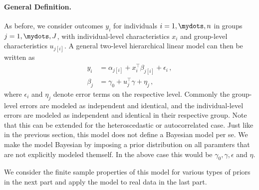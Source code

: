 \paragraph{General Definition.}
As before, we consider outcomes $y_i$ for individuals $i=1,\mydots,n$ in groups $j=1,\mydots,J$, with individual-level characteristics $x_i$ and group-level characteristics $u_{j[i]}$.
A general two-level hierarchical linear model can then be written as
\begin{align}
  y_i &= \alpha_{j[i]} + x_i^{\intercal} \beta_{j[i]} + \epsilon_i \,, \tag{Individual Level}\\
  \beta_j &= \gamma_0 + u_j^{\intercal} \gamma + \eta_j \, \tag{Group Level},
\end{align}
where $\epsilon_i$ and $\eta_j$ denote error terms on the respective level.
Commonly the group-level errors are modeled as independent and identical, and the individual-level errors are modeled as independent and identical in their respective group.
Note that this can be extended for the heteroscedastic or autocorrelated case.
Just like in the previous section, this model does not define a Bayesian model per se.
We make the model Bayesian by imposing a prior distribution on all paramters that are not explicitly modeled themself.
In the above case this would be $\gamma_0, \gamma, \epsilon$ and $\eta$.

We consider the finite sample properties of this model for various types of priors in the next part and apply the model to real data in the last part.


